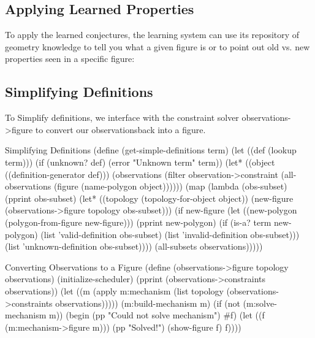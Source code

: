 \subsection{Applying Learned Properties}

To apply the learned conjectures, the learning system can use its
repository of geometry knowledge to tell you what a given figure is or
to point out old vs. new properties seen in a specific figure:


\subsection{Simplifying Definitions}

To Simplify definitions, we interface with the constraint solver
observations->figure to convert our observationsback into a figure.

\begin{code-listing}{Simplifying Definitions}
(define (get-simple-definitions term)
  (let ((def (lookup term)))
    (if (unknown? def)
        (error "Unknown term" term))
    (let* ((object ((definition-generator def)))
           (observations
            (filter
             observation->constraint
             (all-observations
              (figure (name-polygon object))))))
      (map
       (lambda (obs-subset)
         (pprint obs-subset)
         (let* ((topology (topology-for-object object))
                (new-figure
                 (observations->figure topology obs-subset)))
           (if new-figure
               (let ((new-polygon
                      (polygon-from-figure new-figure)))
                 (pprint new-polygon)
                 (if (is-a? term new-polygon)
                     (list 'valid-definition
                           obs-subset)
                     (list 'invalid-definition
                           obs-subset)))
               (list 'unknown-definition
                     obs-subset))))
       (all-subsets observations)))))
\end{code-listing}



\begin{code-listing}{Converting Observations to a Figure}
(define (observations->figure topology observations)
  (initialize-scheduler)
  (pprint (observations->constraints observations))
  (let ((m (apply
            m:mechanism
            (list
             topology
             (observations->constraints observations)))))
    (m:build-mechanism m)
    (if (not (m:solve-mechanism m))
        (begin
          (pp "Could not solve mechanism")
          #f)
        (let ((f (m:mechanism->figure m)))
          (pp "Solved!")
          (show-figure f)
          f))))
\end{code-listing}


